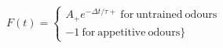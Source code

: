  $F(t) =  \begin{cases} A_{+} e^{−\Delta t/τ+}\:\mathrm{for\:untrained\:odours}\\-1\:\mathrm{for\:appetitive\:odours}\} \end{cases}$
 